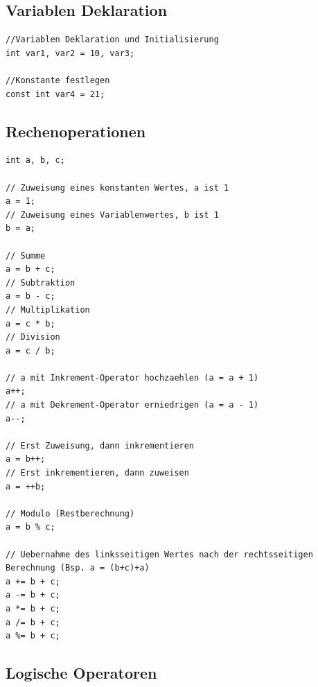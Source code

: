 \documentclass[11pt,a4paper,ngerman, fleqn]{article}
\begin{document}
\subsection{Variablen Deklaration}
\label{sec:22}


\begin{lstlisting}
//Variablen Deklaration und Initialisierung
int var1, var2 = 10, var3;

//Konstante festlegen
const int var4 = 21;
\end{lstlisting}

\subsection{Rechenoperationen}
\label{sec:23}


\begin{lstlisting}
int a, b, c;

// Zuweisung eines konstanten Wertes, a ist 1
a = 1;
// Zuweisung eines Variablenwertes, b ist 1
b = a;

// Summe
a = b + c;
// Subtraktion
a = b - c;
// Multiplikation
a = c * b;
// Division
a = c / b;

// a mit Inkrement-Operator hochzaehlen (a = a + 1)
a++;
// a mit Dekrement-Operator erniedrigen (a = a - 1)
a--;

// Erst Zuweisung, dann inkrementieren
a = b++;
// Erst inkrementieren, dann zuweisen
a = ++b;

// Modulo (Restberechnung)
a = b % c;

// Uebernahme des linksseitigen Wertes nach der rechtsseitigen Berechnung (Bsp. a = (b+c)+a)
a += b + c;
a -= b + c;
a *= b + c;
a /= b + c;
a %= b + c;
\end{lstlisting}

\subsection{Logische Operatoren}
\label{sec:24}
\end{document}

